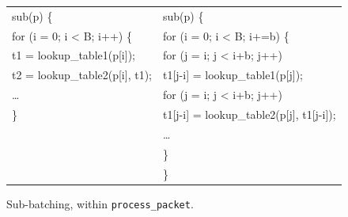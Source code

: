 \begin{figure}[ht]
\begin{small}
\begin{tabular}[b]{l|l}
sub\hspace{0.2cm}{\bf process\_packet}(p) \{ & sub\hspace{0.2cm}{\bf process\_packet}(p) \{\\
\hspace{0.3cm}for (i = 0; i < B; i++) \{ &\hspace{0.3cm}for (i = 0; i < B; i+=b) \{\\
\hspace{0.3cm}t1 = lookup\_table1(p[i]); &\hspace{0.6cm}for (j = i; j < i+b; j++)\\
\hspace{0.3cm}t2 = lookup\_table2(p[i], t1); & \hspace{0.9cm}t1[j-i] = lookup\_table1(p[j]);\\
\hspace{0.3cm}\ldots &\hspace{0.6cm}for (j = i; j < i+b; j++)\\
\} & \hspace{0.9cm}t1[j-i] = lookup\_table2(p[j], t1[j-i]);\\
&\hspace{0.6cm}\ldots\\
&\hspace{0.3cm}\}\\
&\}\\
\end{tabular}
\end{small}
\caption{\label{fig:loop_fission_subbatch} Sub-batching, within {\tt process\_packet}.}
\end{figure}




